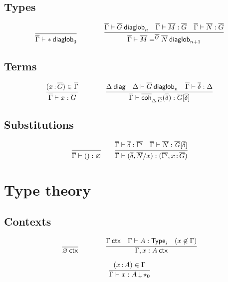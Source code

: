 \subsection{Types}

\begin{small}
  \[
  \infer{\wfdiaglob{\diag\Gamma}{\diagbase}0}{}
  \qquad\qquad
  \infer
    {\wfdiaglob{\diag\Gamma}{\homj{\diag G}{\diag M}{\diag N}}{n+1}}
    {\wfdiaglob{\diag\Gamma}{\diag G}n
    &\ofdiaglob{\diag\Gamma}{\diag M}{\diag G}
    &\ofdiaglob{\diag\Gamma}{\diag N}{\diag G}}
  \]
\end{small}

\subsection{Terms}

\begin{small}
  \[
  \infer{\ofdiaglob{\diag\Gamma}{x}{\diag G}}
  {(\tptm{x}{\diag G})\in\diag\Gamma}
  \qquad\qquad
  \infer{\ofdiaglob{\diag\Gamma}{\diagcoh{\Delta.\diag G}{\diag\delta}}
    {\diag G[\diag\delta]}}
  {\wfdiag{\Delta} 
    & \wfdiaglob{\Delta}{\diag G}n
    & \substdiaglob{\diag\Gamma}{\diag\delta}{\Delta}}
  \]
\end{small}

\subsection{Substitutions}

\begin{small}
  \[
  \infer{\substdiaglob{\diag\Gamma}{()}{\emptyctx}}
  {}
  \qquad
  \infer{\substdiaglob{\diag\Gamma}{(\diag \delta,\diag N/x)}
    {(\diag{\Gamma'},\tptm{x}{\diag G})}}
  {\substdiaglob{\diag\Gamma}{\diag \delta}{\diag{\Gamma'}}
    & \ofdiaglob{\diag\Gamma}{\diag N}{\tsubst{\diag G}{\diag \delta}}}
  \]
\end{small}

\section{Type theory}

\subsection{Contexts}

\begin{small}
  \[
  \infer{\wfctx{\varnothing}}{}
  \qquad\qquad
  \infer{\wfctx{\Gamma,x:A}}
  {\wfctx{\Gamma}
    & \wftype{\Gamma}{A}
    & (x\not\in\Gamma)}
  \]

\[
\infer{\ofdepglob{\Gamma}{x}{A}{\unitglobelt 0}}{(\tptm xA)\in\Gamma}
\]
\end{small}

